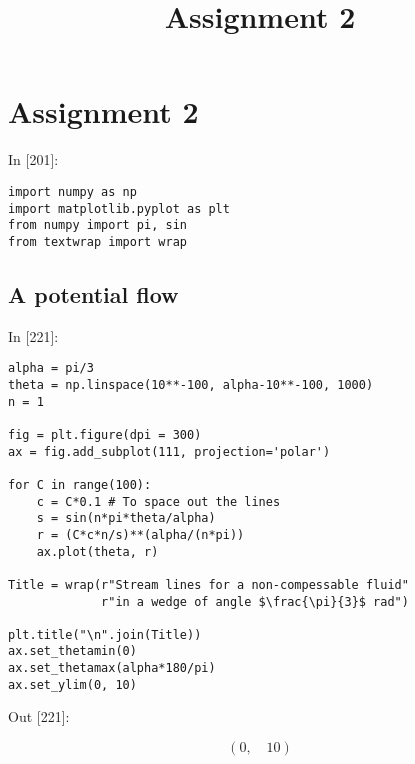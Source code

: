 \documentclass[11pt]{article}
\title{Assignment 2}
\newif\ifcode
\newif\ifleftmargins
\newlength{\promptlength}
\newcommand{\prompt}[3]{
        \needspace{1.1cm}
        \settowidth{\promptlength}{ #1 [#3] }
        \ifleftmargins\hspace{-\promptlength}\hspace{-5pt}\fi
        {\color{#2}#1 [#3]:}
        \ifleftmargins\vspace{-2.7ex}\fi
    }
\begin{document}
    
    
    
    
    

    
    \hypertarget{assignment-2}{%
\section{Assignment 2}\label{assignment-2}}

    
\prompt{In}{incolor}{201}
\codetrue
\begin{tcolorbox}[breakable, size=fbox, boxrule=1pt, pad at break*=1mm, colback=cellbackground, colframe=cellborder]
\begin{verbatim}
import numpy as np
import matplotlib.pyplot as plt
from numpy import pi, sin
from textwrap import wrap
\end{verbatim}
\end{tcolorbox}
\codefalse

    \hypertarget{a-potential-flow}{%
\subsection{A potential flow}\label{a-potential-flow}}

    
\prompt{In}{incolor}{221}
\codetrue
\begin{tcolorbox}[breakable, size=fbox, boxrule=1pt, pad at break*=1mm, colback=cellbackground, colframe=cellborder]
\begin{verbatim}
alpha = pi/3
theta = np.linspace(10**-100, alpha-10**-100, 1000)
n = 1

fig = plt.figure(dpi = 300)
ax = fig.add_subplot(111, projection='polar')

for C in range(100):
    c = C*0.1 # To space out the lines
    s = sin(n*pi*theta/alpha)
    r = (C*c*n/s)**(alpha/(n*pi))
    ax.plot(theta, r)

Title = wrap(r"Stream lines for a non-compessable fluid"
             r"in a wedge of angle $\frac{\pi}{3}$ rad")

plt.title("\n".join(Title))
ax.set_thetamin(0)
ax.set_thetamax(alpha*180/pi)
ax.set_ylim(0, 10)
\end{verbatim}
\end{tcolorbox}
\codefalse
 
            
\prompt{Out}{outcolor}{221}
    
    $$\left ( 0, \quad 10\right )$$

    

    \begin{center}
    \end{center}
    { \hspace*{\fill} \\}
    
\end{document}
